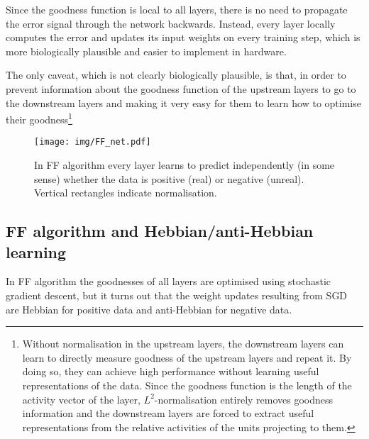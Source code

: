 \documentclass[a4paper, 11pt]{article}
\begin{document}
Since the goodness function is local to all layers, there is no need to propagate the error signal through the network backwards. Instead, every layer locally computes the error and updates its input weights on every training step, which is more biologically plausible and easier to implement in hardware.

The only caveat, which is not clearly biologically plausible, is that, in order to prevent information about the goodness function of the upstream layers to go to the downstream layers and making it very easy for them to learn how to optimise their goodness\footnote{Without normalisation in the upstream layers, the downstream layers can learn to directly measure goodness of the upstream layers and repeat it. By doing so, they can achieve high performance without learning useful representations of the data. Since the goodness function is the length of the activity vector of the layer, $L^2$-normalisation entirely removes goodness information and the downstream layers are forced to extract useful representations from the relative activities of the units projecting to them.}

\begin{figure}[h]
  \begin{center}
    \texttt{[image: img/FF\_net.pdf]}
  \end{center}  
  \caption{In FF algorithm every layer learns to predict independently (in some sense) whether the data is positive (real) or negative (unreal). Vertical rectangles indicate normalisation.}
\end{figure}

\subsection{FF algorithm and Hebbian/anti-Hebbian learning}
In FF algorithm the goodnesses of all layers are optimised using stochastic gradient descent, but it turns out that the weight updates resulting from SGD are Hebbian for positive data and anti-Hebbian for negative data.
\end{document}
